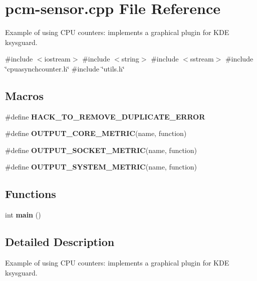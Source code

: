 \hypertarget{pcm-sensor_8cpp}{}\section{pcm-\/sensor.cpp File Reference}
\label{pcm-sensor_8cpp}


Example of using C\+PU counters\+: implements a graphical plugin for K\+DE ksysguard.  


{\ttfamily \#include $<$iostream$>$}\newline
{\ttfamily \#include $<$string$>$}\newline
{\ttfamily \#include $<$sstream$>$}\newline
{\ttfamily \#include \char`\"{}cpuasynchcounter.\+h\char`\"{}}\newline
{\ttfamily \#include \char`\"{}utils.\+h\char`\"{}}\newline
\subsection*{Macros}
\begin{DoxyCompactItemize}
\item 
\mbox{\label{pcm-sensor_8cpp_ac4eeb11d89b0f517835a12a04443ebe4}} 
\#define {\bfseries H\+A\+C\+K\+\_\+\+T\+O\+\_\+\+R\+E\+M\+O\+V\+E\+\_\+\+D\+U\+P\+L\+I\+C\+A\+T\+E\+\_\+\+E\+R\+R\+OR}
\item 
\#define {\bfseries O\+U\+T\+P\+U\+T\+\_\+\+C\+O\+R\+E\+\_\+\+M\+E\+T\+R\+IC}(name,  function)
\item 
\#define {\bfseries O\+U\+T\+P\+U\+T\+\_\+\+S\+O\+C\+K\+E\+T\+\_\+\+M\+E\+T\+R\+IC}(name,  function)
\item 
\#define {\bfseries O\+U\+T\+P\+U\+T\+\_\+\+S\+Y\+S\+T\+E\+M\+\_\+\+M\+E\+T\+R\+IC}(name,  function)
\end{DoxyCompactItemize}
\subsection*{Functions}
\begin{DoxyCompactItemize}
\item 
\mbox{\label{pcm-sensor_8cpp_ae66f6b31b5ad750f1fe042a706a4e3d4}} 
int {\bfseries main} ()
\end{DoxyCompactItemize}


\subsection{Detailed Description}
Example of using C\+PU counters\+: implements a graphical plugin for K\+DE ksysguard. 



